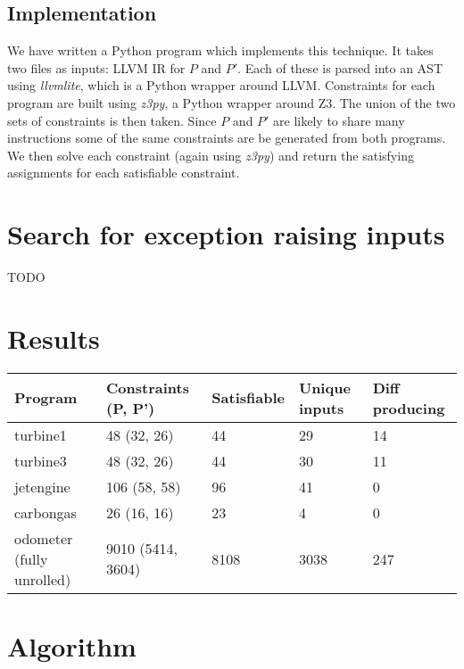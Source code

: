 \subsection{Implementation}

We have written a Python program which implements this technique. It takes two
files as inputs: LLVM IR for $P$ and $P'$. Each of these is parsed into an AST
using \textit{llvmlite}, which is a Python wrapper around LLVM. Constraints for
each program are built using \textit{z3py}, a Python wrapper around Z3. The
union of the two sets of constraints is then taken. Since $P$ and $P'$ are
likely to share many instructions some of the same constraints are be generated
from both programs. We then solve each constraint (again using \textit{z3py})
and return the satisfying assignments for each satisfiable constraint.

\section{Search for exception raising inputs}

TODO

\section{Results}

\begin{table}[]
\begin{tabular}{l|llll}
Program                   & Constraints (P, P') & Satisfiable & Unique inputs & Diff producing \\ \hline
turbine1                  & 48 (32, 26)         & 44          & 29            & 14             \\
turbine3                  & 48 (32, 26)         & 44          & 30            & 11             \\
jetengine                 & 106 (58, 58)        & 96          & 41            & 0              \\
carbongas                 & 26 (16, 16)         & 23          & 4             & 0              \\
odometer (fully unrolled) & 9010 (5414, 3604)   & 8108        & 3038          & 247
\end{tabular}
\end{table}

\section{Algorithm}


